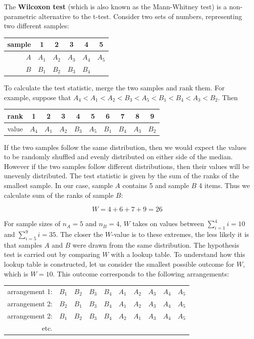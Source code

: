 The \textbf{Wilcoxon test} (which is also known as the Mann-Whitney
test) is a non-parametric alternative to the t-test. Consider two sets
of numbers, representing two different samples:

\begin{center}
\begin{tabular}{r|ccccc}
 sample & 1 & 2 & 3 & 4 & 5 \\ \hline
 $A$ & $A_1$ & $A_2$ & $A_3$ & $A_4$ & $A_5$ \\
 $B$ & $B_1$ & $B_2$ & $B_3$ & $B_4$ 
\end{tabular}
\label{tab:mannwhitneygeneric}
\end{center}

\noindent To calculate the test statistic, merge the two samples and
rank them.  For example, suppose that $A_4 < A_1 < A_2 < B_3 < A_5 <
B_1 < B_4 < A_3 < B_2$. Then

\begin{center}
\begin{tabular}{c|ccccccccc}
  rank & 1 & 2 & 3 & 4 & 5 & 6 & 7 & 8 & 9 \\ \hline
  value & $A_4$ & $A_1$ & $A_2$ & $B_3$ & $A_5$ & $B_1$ & $B_4$ & $A_3$ & $B_2$
\end{tabular}
\end{center}

If the two samples follow the same distribution, then we would expect
the values to be randomly shuffled and evenly distributed on either
side of the median. However if the two samples follow different
distributions, then their values will be unevenly distributed.  The
test statistic is given by the sum of the ranks of the smallest
sample. In our case, sample $A$ contains 5 and sample $B$ 4 items.
Thus we calculate sum of the ranks of sample $B$:

\[
W = 4 + 6 + 7 + 9 = 26
\]

For sample sizes of $n_A=5$ and $n_B=4$, $W$ takes on values between
$\sum_{i=1}^{4}i=10$ and $\sum_{i=5}^{9}i=35$. The closer the
$W$-value is to these extremes, the less likely it is that samples $A$
and $B$ were drawn from the same distribution. The hypothesis test is
carried out by comparing $W$ with a lookup table. To understand how
this lookup table is constructed, let us consider the smallest
possible outcome for $W$, which is $W=10$. This outcome corresponds to
the following arrangements:

\begin{center}
  \begin{tabular}{r|ccccccccc}
    arrangement 1: & $B_1$ & $B_2$ & $B_3$ & $B_4$ & $A_1$ &
    $A_2$ & $A_3$ & $A_4$ & $A_5$ \\
    arrangement 2: & $B_2$ & $B_1$ & $B_3$ & $B_4$ & $A_1$ &
    $A_2$ & $A_3$ & $A_4$ & $A_5$ \\
    arrangement 2: & $B_1$ & $B_2$ & $B_3$ & $B_4$ & $A_2$ &
    $A_1$ & $A_3$ & $A_4$ & $A_5$ \\
    etc. & & & & & & & & & 
  \end{tabular}
\end{center}

